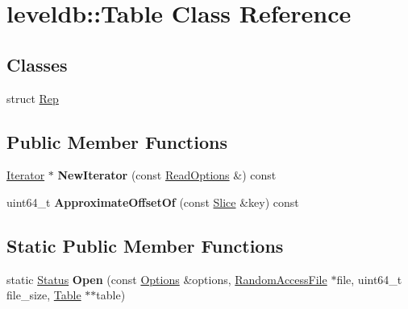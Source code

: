 \hypertarget{classleveldb_1_1_table}{}\section{leveldb\+:\+:Table Class Reference}
\label{classleveldb_1_1_table}
\subsection*{Classes}
\begin{DoxyCompactItemize}
\item 
struct \mbox{\hyperlink{structleveldb_1_1_table_1_1_rep}{Rep}}
\end{DoxyCompactItemize}
\subsection*{Public Member Functions}
\begin{DoxyCompactItemize}
\item 
\mbox{\label{classleveldb_1_1_table_ae045deec05a0746abd0bddbb1442d890}} 
\mbox{\hyperlink{classleveldb_1_1_iterator}{Iterator}} $\ast$ {\bfseries New\+Iterator} (const \mbox{\hyperlink{structleveldb_1_1_read_options}{Read\+Options}} \&) const
\item 
\mbox{\label{classleveldb_1_1_table_ae9f828f621836e12d154cbe78d6fba3e}} 
uint64\+\_\+t {\bfseries Approximate\+Offset\+Of} (const \mbox{\hyperlink{classleveldb_1_1_slice}{Slice}} \&key) const
\end{DoxyCompactItemize}
\subsection*{Static Public Member Functions}
\begin{DoxyCompactItemize}
\item 
\mbox{\label{classleveldb_1_1_table_aa25d0e074ab4de46e583522a8c0e9582}} 
static \mbox{\hyperlink{classleveldb_1_1_status}{Status}} {\bfseries Open} (const \mbox{\hyperlink{structleveldb_1_1_options}{Options}} \&options, \mbox{\hyperlink{classleveldb_1_1_random_access_file}{Random\+Access\+File}} $\ast$file, uint64\+\_\+t file\+\_\+size, \mbox{\hyperlink{classleveldb_1_1_table}{Table}} $\ast$$\ast$table)
\end{DoxyCompactItemize}
